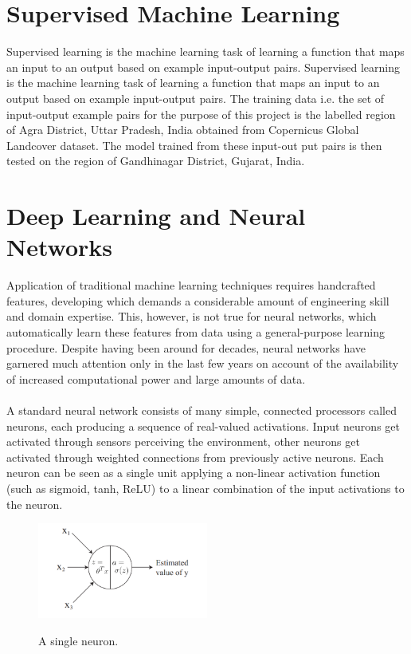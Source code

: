 \documentclass[12pt, a4paper]{report}
\begin{document}
\section{Supervised Machine Learning}
Supervised learning is the machine learning task of learning a function that maps an input to an output based on example input-output pairs.\cite{supervisedlearningone} Supervised learning is the machine learning task of learning a function that maps an input to an output based on example input-output pairs.\cite{supervisedlearningtwo} The training data i.e. the set of input-output example pairs for the purpose of this project is the labelled region of Agra District, Uttar Pradesh, India obtained from Copernicus Global Landcover dataset. The model trained from these input-out put pairs is then tested on the region of Gandhinagar District, Gujarat, India.

\section{Deep Learning and Neural Networks}
Application of traditional machine learning techniques requires handcrafted features, developing which demands a considerable amount of engineering skill and domain expertise. This, however, is not true for neural networks, which automatically learn these features from data using a general-purpose learning procedure.\cite{eyesky, cs231n} Despite having been around for decades, neural networks have garnered much attention only in the last few years on account of the availability of increased computational power and large amounts of data.
\paragraph{}
A standard neural network consists of many simple, connected processors called neurons, each producing a sequence of real-valued activations. Input neurons get activated through sensors perceiving the environment, other neurons get activated through weighted connections from previously active neurons. \cite{schmidhuber2015deep} Each neuron can be seen as a single unit applying a non-linear activation function (such as sigmoid, tanh, ReLU) to a linear combination of the input activations to the neuron.\cite{cs229}
\begin{figure}[h]
\centering
\includegraphics[width=0.5\textwidth]{nn1.png}
\caption{A single neuron.}\cite{cs229}
\end{figure}
\end{document}
